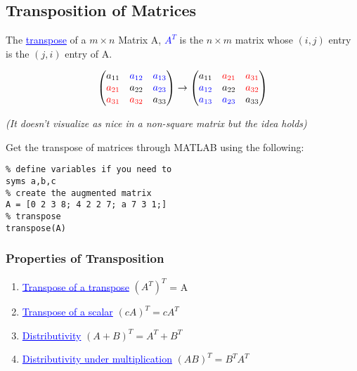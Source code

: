 \documentclass{article}
\newcommand{\bul}[1]{\textcolor{blue}{\underline{#1}}}
\begin{document}
\subsection{Transposition of Matrices}
The \bul{transpose} of a $m \times n$ Matrix A, \bul{$A^T$} is the $n\times m$ matrix whose $(i,j)$ entry is the $(j,i)$ entry of A.

\[
\begin{pmatrix}
a_{11} & \textcolor{blue}{a_{12}} & \textcolor{blue}{a_{13}} \\
\textcolor{red}{a_{21}} & a_{22} & \textcolor{blue}{a_{23}} \\
\textcolor{red}{a_{31}} & \textcolor{red}{a_{32}} & a_{33} 
\end{pmatrix}
\rightarrow
\begin{pmatrix}
a_{11} & \textcolor{red}{a_{21}} & \textcolor{red}{a_{31}} \\
\textcolor{blue}{a_{12}} & a_{22} & \textcolor{red}{a_{32}} \\
\textcolor{blue}{a_{13}} & \textcolor{blue}{a_{23}} & a_{33} 
\end{pmatrix}
\]

\textit{(It doesn't visualize as nice in a non-square matrix but the idea holds)}

\begin{tcolorbox}[title=MATLAB tip, colback=blue!5, colframe=blue!80!black]
    Get the transpose of matrices through MATLAB using the following:
    \begin{lstlisting}
% define variables if you need to
syms a,b,c
% create the augmented matrix 
A = [0 2 3 8; 4 2 2 7; a 7 3 1;]
% transpose
transpose(A)
    \end{lstlisting}
\end{tcolorbox}

\subsubsection{Properties of Transposition}
\begin{enumerate}
    \item \bul{Transpose of a transpose} $({A^T})^T$ = A
    \item \bul{Transpose of a scalar} $(cA)^T = cA^T$
    \item \bul{Distributivity} $(A+B)^T = A^T + B^T$
    \item \bul{Distributivity under multiplication} $(AB)^T = B^TA^T$
\end{enumerate}
\end{document}

